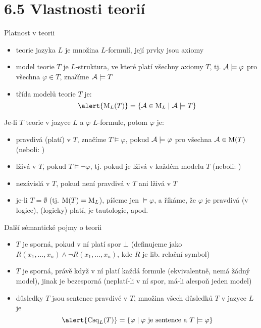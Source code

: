 \documentclass{beamer}
\begin{document}
\section{6.5 Vlastnosti teorií}


\begin{frame}{Platnost v teorii}

    \begin{itemize}
        \item \alert{teorie} jazyka $L$ je množina $L$-formulí, její prvky jsou \alert{axiomy}
        \item \alert{model} teorie $T$ je $L$-struktura, ve které platí všechny axiomy $T$, tj. $\mathcal{A}\models\varphi$ pro všechna $\varphi\in T$, značíme $\mathcal{A}\models T$
        \item \alert{třída modelů} teorie $T$ je:
        $$
        \alert{\M_L(T)}=\{\A\in\M_L\mid\A\models T\}
        $$
    \end{itemize}
    
    Je-li $T$ teorie v jazyce $L$ a $\varphi$ $L$-formule, potom $\varphi$ je:
    \begin{itemize}
        \item \alert{pravdivá (platí) v $T$}, značíme \alert{$T\models\varphi$}, pokud $\mathcal{A}\models\varphi$ pro všechna $\mathcal{A}\in\operatorname{M}(T)$ (neboli: )
        \item \alert{lživá v $T$}, pokud $T\models\neg\varphi$, tj. pokud je lživá v každém modelu $T$ (neboli: )
        \item \alert{nezávislá v $T$}, pokud není pravdivá v $T$ ani lživá v $T$
        \item je-li $T=\emptyset$ (tj. $\operatorname{M}(T)=\operatorname{M}_L$), píšeme jen \alert{$\models\varphi$}, a říkáme, že $\varphi$ \alert{je pravdivá (v logice), (logicky) platí, je tautologie}, apod.
    \end{itemize}
    
\end{frame}


\begin{frame}{Další sémantické pojmy o teorii}
    
    \begin{itemize}
        \item $T$ je \alert{sporná}, pokud v ní platí \alert{spor} $\bot$ (definujeme jako $R(x_1,\dots,x_n)\land \neg R(x_1,\dots,x_n)$, kde $R$ je lib. relační symbol)
        \item $T$ je sporná, právě když v ní platí každá formule (ekvivalentně, nemá žádný model), jinak je \alert{bezesporná} (neplatí-li v ní spor, má-li alespoň jeden model)
        \item \alert{důsledky} $T$ jsou \alert{sentence} pravdivé v $T$, množina všech důsledků $T$ v jazyce $L$ je
        $$
        \alert{\Conseq_L(T)}=\{\varphi\mid\text{$\varphi$ je sentence a }T\models \varphi\}
        $$
    \end{itemize}

\end{frame}
\end{document}
